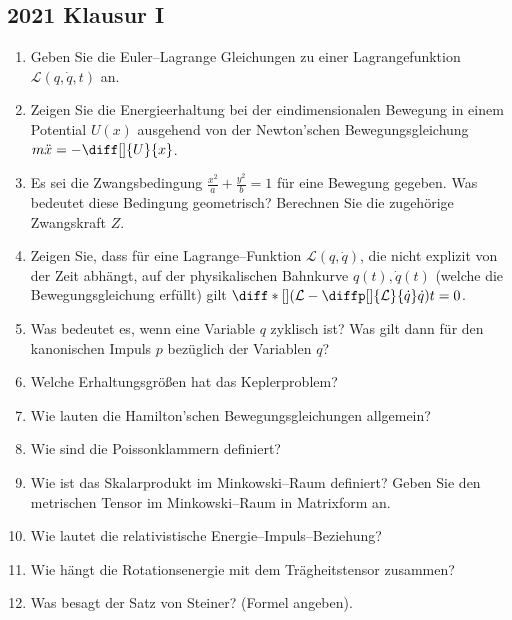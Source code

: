 \documentclass[a4paper,12pt]{article}
\numberwithin{equation}{section}
\begin{document}
\newpage
\subsection{2021 Klausur I}
\begin{enumerate}[label=\arabic*.]
        \item Geben Sie die Euler--Lagrange Gleichungen zu einer Lagrangefunktion $\mathcal{L}\left(q,\dot{q},t\right)$ an.
        \item Zeigen Sie die Energieerhaltung bei der eindimensionalen Bewegung in einem Potential $U\left(x\right)$ ausgehend von der Newton'schen Bewegungsgleichung $m\ddot{x}=-\diff[]{U}{x}$.
        \item Es sei die Zwangsbedingung $\tfrac{x^2}{a}+\tfrac{y^2}{b}=1$ für eine Bewegung gegeben. Was bedeutet diese Bedingung geometrisch? Berechnen Sie die zugehörige Zwangskraft $Z$.
        \item Zeigen Sie, dass für eine Lagrange--Funktion $\mathcal{L}\left(q,\dot{q}\right)$, die nicht explizit von der Zeit abhängt, auf der physikalischen Bahnkurve $q\left(t\right),\dot{q}\left(t\right)$ (welche die Bewegungsgleichung erfüllt) gilt $\diff*[]{\left(\mathcal{L}-\diffp[]{\mathcal{L}}{\dot{q}}\dot{q}\right)}{t}=0$.
        \item Was bedeutet es, wenn eine Variable $q$ zyklisch ist? Was gilt dann für den kanonischen Impuls $p$ bezüglich der Variablen $q$?
        \item Welche Erhaltungsgrößen hat das Keplerproblem?
        \item Wie lauten die Hamilton'schen Bewegungsgleichungen allgemein?
        \item Wie sind die Poissonklammern definiert?
        \item Wie ist das Skalarprodukt im Minkowski--Raum definiert? Geben Sie den metrischen Tensor im Minkowski--Raum in Matrixform an.
        \item Wie lautet die relativistische Energie--Impuls--Beziehung?
        \item Wie hängt die Rotationsenergie mit dem Trägheitstensor zusammen?
        \item Was besagt der Satz von Steiner? (Formel angeben).
\end{enumerate}

\newpage
\end{document}
